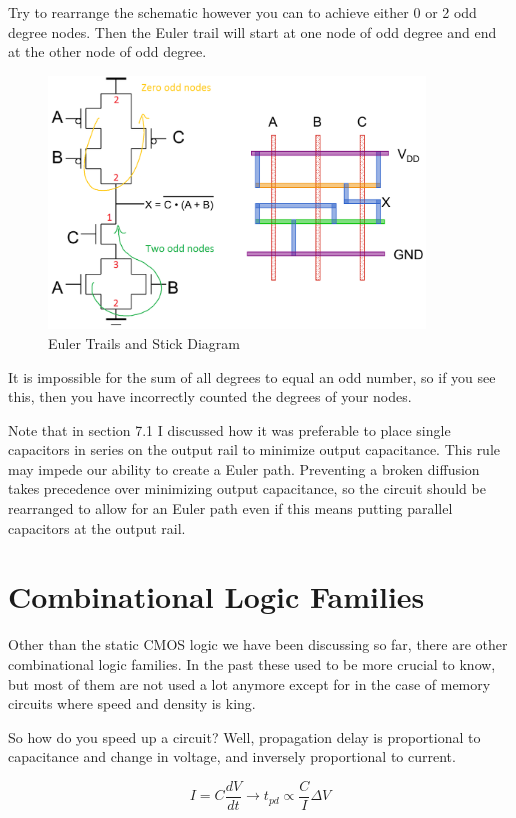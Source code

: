 \documentclass{article}
\begin{document}
Try to rearrange the schematic however you can to achieve either 0 or 2 odd degree nodes. Then the Euler trail will start at one node of odd degree and end at the other node of odd degree. 

\begin{figure}[ht!]
\centering
\includegraphics[width=100mm]{stick2.png}
\caption{Euler Trails and Stick Diagram}
\end{figure}

It is impossible for the sum of all degrees to equal an odd number, so if you see this, then you have incorrectly counted the degrees of your nodes.

Note that in section 7.1 I discussed how it was preferable to place single capacitors in series on the output rail to minimize output capacitance. This rule may impede our ability to create a Euler path. Preventing a broken diffusion takes precedence over minimizing output capacitance, so the circuit should be rearranged to allow for an Euler path even if this means putting parallel capacitors at the output rail.


\section{Combinational Logic Families}

Other than the static CMOS logic we have been discussing so far, there are other combinational logic families. In the past these used to be more crucial to know, but most of them are not used a lot anymore except for in the case of memory circuits where speed and density is king.

So how do you speed up a circuit? Well, propagation delay is proportional to capacitance and change in voltage, and inversely proportional to current. 

$$I = C \frac{dV}{dt} \rightarrow t_{pd} \propto \frac{C}{I} \Delta V$$
\end{document}
